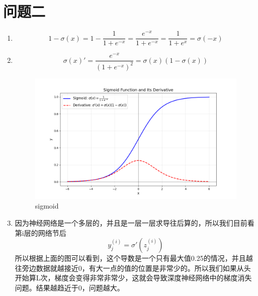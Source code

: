 \documentclass[answers]{exam}  %
\begin{document}
\section{问题二}
\begin{enumerate}[label=\alph*.] 
    \item \[
        1 - \sigma(x) = 1 - \frac{1}{1 + e^{-x}} = \frac{e^{-x}}{1 + e^{-x}} = \frac{1}{1 + e^{x}} = \sigma(-x)
    \]  
    \item \[
        \sigma(x)' = \frac{e^{-x}}{(1 + e^{-x})^2} = \sigma(x)(1 - \sigma(x))
    \]
    \begin{figure}[h!]
        \centering
        \includegraphics[scale=0.5]{sigmoid.png}
        \caption{sigmoid}
        \label{sigmoid}
    \end{figure}
    \item 因为神经网络是一个多层的，并且是一层一层求导往后算的，所以我们目前看第i层的网络节后
    \[
        y_j^{(i)} = \sigma'(z_j^{(i)})
    \]
    所以根据上面的图可以看到，这个导数是一个只有最大值0.25的情况，并且越往旁边数据就越接近0，有大一点的值的位置是非常少的。所以我们如果从头开始算L次，梯度会变得非常非常少，这就会导致深度神经网络中的梯度消失问题。结果越趋近于0，问题越大。
\end{enumerate}
\end{document}
